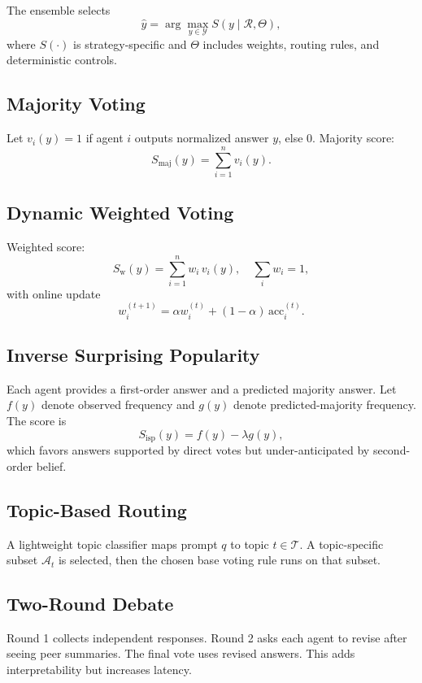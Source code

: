 \documentclass[conference]{IEEEtran}
\begin{document}
The ensemble selects
\begin{equation}
\hat{y}=\arg\max_{y\in\mathcal{Y}} S(y\mid\mathcal{R},\Theta),
\end{equation}
where $S(\cdot)$ is strategy-specific and $\Theta$ includes weights, routing rules, and deterministic controls.

\subsection{Majority Voting}
Let $v_i(y)=1$ if agent $i$ outputs normalized answer $y$, else $0$. Majority score:
\begin{equation}
S_{\text{maj}}(y)=\sum_{i=1}^{n} v_i(y).
\end{equation}

\subsection{Dynamic Weighted Voting}
Weighted score:
\begin{equation}
S_{\text{w}}(y)=\sum_{i=1}^{n} w_i\,v_i(y), \quad \sum_i w_i=1,
\end{equation}
with online update
\begin{equation}
w_i^{(t+1)}=\alpha w_i^{(t)} + (1-\alpha)\,\text{acc}_i^{(t)}.
\end{equation}

\subsection{Inverse Surprising Popularity}
Each agent provides a first-order answer and a predicted majority answer. Let $f(y)$ denote observed frequency and $g(y)$ denote predicted-majority frequency. The score is
\begin{equation}
S_{\text{isp}}(y)=f(y)-\lambda g(y),
\end{equation}
which favors answers supported by direct votes but under-anticipated by second-order belief.

\subsection{Topic-Based Routing}
A lightweight topic classifier maps prompt $q$ to topic $t\in\mathcal{T}$. A topic-specific subset $\mathcal{A}_t$ is selected, then the chosen base voting rule runs on that subset.

\subsection{Two-Round Debate}
Round 1 collects independent responses. Round 2 asks each agent to revise after seeing peer summaries. The final vote uses revised answers. This adds interpretability but increases latency.
\end{document}

